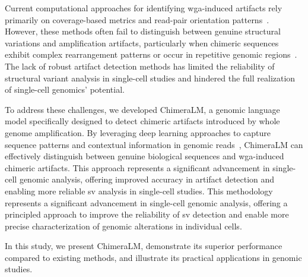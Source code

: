 \documentclass[pdflatex,sn-nature]{sn-jnl}%
\theoremstyle{thmstyleone}%
\theoremstyle{thmstyletwo}%
\theoremstyle{thmstylethree}%
\begin{document}
Current computational approaches for identifying \gls{wga}-induced artifacts rely primarily on coverage-based metrics and read-pair orientation patterns~\cite{kiguchi2021long, lu2023exploration}.
However, these methods often fail to distinguish between genuine structural variations and amplification artifacts, particularly when chimeric sequences exhibit complex rearrangement patterns or occur in repetitive genomic regions~\cite{kosugi2019comprehensive, mahmoud2019structural}.
The lack of robust artifact detection methods has limited the reliability of structural variant analysis in single-cell studies and hindered the full realization of single-cell genomics' potential.

To address these challenges, we developed ChimeraLM, a genomic language model specifically designed to detect chimeric artifacts introduced by whole genome amplification.
By leveraging deep learning approaches to capture sequence patterns and contextual information in genomic reads~\cite{dalla2025nucleotide, zhou2023dnabert, nguyen2023hyenadna}, ChimeraLM can effectively distinguish between genuine biological sequences and \gls{wga}-induced chimeric artifacts.
This approach represents a significant advancement in single-cell genomic analysis, offering improved accuracy in artifact detection and enabling more reliable \gls{sv} analysis in single-cell studies.
This methodology represents a significant advancement in single-cell genomic analysis, offering a principled approach to improve the reliability of \gls{sv} detection and enable more precise characterization of genomic alterations in individual cells.

In this study, we present ChimeraLM, demonstrate its superior performance compared to existing methods, and illustrate its practical applications in genomic studies.
\end{document}
